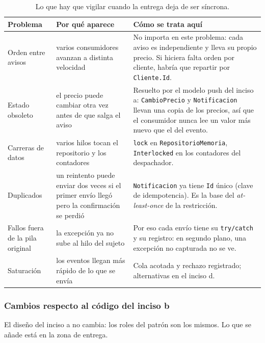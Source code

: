 \begin{table}[H]
\centering
\small
\begin{tabularx}{\textwidth}{>{\raggedright\arraybackslash}p{2.6cm} >{\raggedright\arraybackslash}p{4.4cm} >{\raggedright\arraybackslash}X}
\toprule
\textbf{Problema} & \textbf{Por qué aparece} & \textbf{Cómo se trata aquí} \\
\midrule
Orden entre avisos & varios consumidores avanzan a distinta velocidad &
No importa en este problema: cada aviso es independiente y lleva su propio precio. Si hiciera
falta orden por cliente, habría que repartir por \texttt{Cliente.Id}. \\
\addlinespace
Estado obsoleto & el precio puede cambiar otra vez antes de que salga el aviso &
Resuelto por el modelo push del inciso a: \texttt{CambioPrecio} y \texttt{Notificacion}
llevan una copia de los precios, así que el consumidor nunca lee un valor más nuevo que el
del evento. \\
\addlinespace
Carreras de datos & varios hilos tocan el repositorio y los contadores &
\texttt{lock} en \texttt{RepositorioMemoria}, \texttt{Interlocked} en los contadores del
despachador. \\
\addlinespace
Duplicados & un reintento puede enviar dos veces si el primer envío llegó pero la
confirmación se perdió &
\texttt{Notificacion} ya tiene \texttt{Id} único (clave de idempotencia). Es la base del
\emph{at-least-once} de la restricción. \\
\addlinespace
Fallos fuera de la pila original & la excepción ya no sube al hilo del sujeto &
Por eso cada envío tiene su \texttt{try/catch} y su registro: en segundo plano, una excepción
no capturada no se ve. \\
\addlinespace
Saturación & los eventos llegan más rápido de lo que se envía &
Cola acotada y rechazo registrado; alternativas en el inciso d. \\
\bottomrule
\end{tabularx}
\caption{Lo que hay que vigilar cuando la entrega deja de ser síncrona.}
\end{table}

\subsubsection{Cambios respecto al código del inciso b}

El diseño del inciso a no cambia: los roles del patrón son los mismos. Lo que se añade está
en la zona de entrega.

